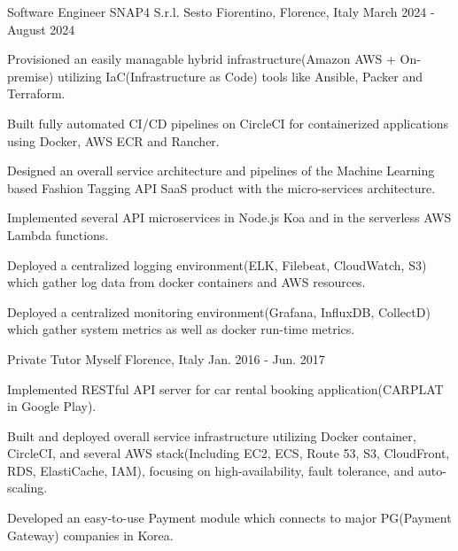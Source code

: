 

\begin{cventries}

  \cventry
    {Software Engineer} %
    {SNAP4 S.r.l.} %
    {Sesto Fiorentino, Florence, Italy} %
    {March 2024 - August 2024} %
    {
      \begin{cvitems} %
        \item {Provisioned an easily managable hybrid infrastructure(Amazon AWS + On-premise) utilizing IaC(Infrastructure as Code) tools like Ansible, Packer and Terraform.}
        \item {Built fully automated CI/CD pipelines on CircleCI for containerized applications using Docker, AWS ECR and Rancher.}
        \item {Designed an overall service architecture and pipelines of the Machine Learning based Fashion Tagging API SaaS product with the micro-services architecture.}
        \item {Implemented several API microservices in Node.js Koa and in the serverless AWS Lambda functions.}
        \item {Deployed a centralized logging environment(ELK, Filebeat, CloudWatch, S3) which gather log data from docker containers and AWS resources.}
        \item {Deployed a centralized monitoring environment(Grafana, InfluxDB, CollectD) which gather system metrics as well as docker run-time metrics.}
      \end{cvitems}
    }

  \cventry
    {Private Tutor} %
    {Myself} %
    {Florence, Italy} %
    {Jan. 2016 - Jun. 2017} %
    {
      \begin{cvitems} %
        \item {Implemented RESTful API server for car rental booking application(CARPLAT in Google Play).}
        \item {Built and deployed overall service infrastructure utilizing Docker container, CircleCI, and several AWS stack(Including EC2, ECS, Route 53, S3, CloudFront, RDS, ElastiCache, IAM), focusing on high-availability, fault tolerance, and auto-scaling.}
        \item {Developed an easy-to-use Payment module which connects to major PG(Payment Gateway) companies in Korea.}
      \end{cvitems}
    }


\end{cventries}

